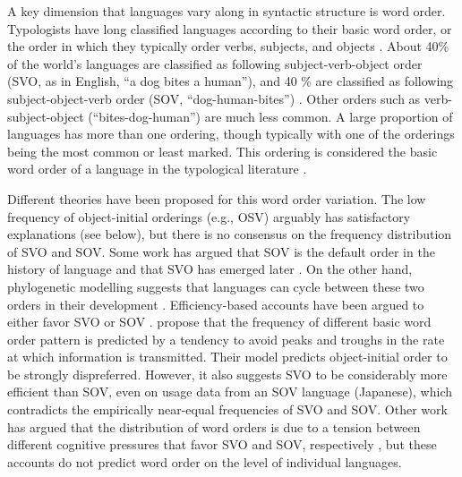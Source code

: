 \documentclass[11pt,a4paper]{article}
\begin{document}
A key dimension that languages vary along in syntactic structure is word order.
Typologists have long classified languages according to their basic word order, or the order in which they typically order verbs, subjects, and objects \citep{greenberg-universals-1963}.
About 40\% of the world's languages are classified as following subject-verb-object order ({SVO}, as in English, ``a dog bites a human''), and 40 \% are classified as following subject-object-verb order ({SOV}, ``dog-human-bites'') \citep{wals-81}.
Other orders such as verb-subject-object (``bites-dog-human'') are much less common.
A large proportion of languages has more than one ordering, though typically with one of the orderings being the most common or least marked.
This ordering is considered the  basic word order of a language in the typological literature \citep{greenberg-universals-1963, wals-s6}.


Different theories have been proposed for this word order variation.
The low frequency of object-initial orderings (e.g., OSV) arguably has satisfactory explanations (see below), but there is no consensus on the frequency distribution of SVO and SOV.
Some work has argued that SOV is the default order in the history of language and that SVO has emerged later \citep{givon1979understanding,senghas1997argument, newmeyer2000evolutionary, goldin-meadow2008natural, gibson-noisy-channel-2013}.
On the other hand, phylogenetic modelling suggests that languages can cycle between these two orders in their development \citep{maurits2014tracing}.
Efficiency-based accounts have been argued to either favor SVO or SOV \citep{maurits2010why, ferrer-i-cancho-placement-2017}.
\cite{maurits2010why} propose that the frequency of different basic word order pattern is predicted by a tendency to avoid peaks and troughs in the rate at which information is transmitted.
Their model predicts object-initial order to be strongly dispreferred.
However, it also suggests SVO to be considerably more efficient than SOV, even on usage data from an SOV language (Japanese), which contradicts the empirically near-equal frequencies of SVO and SOV.
Other work has argued that the distribution of word orders is due to a tension between different cognitive pressures that favor SVO and SOV, respectively \citep{langus2010cognitive, ferrer-i-cancho-placement-2017}, but these accounts do not predict word order on the level of individual languages. 

\end{document}
